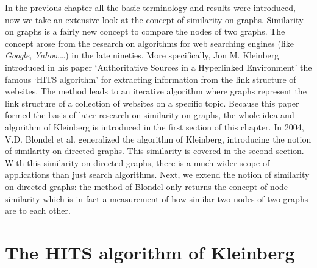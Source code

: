 \documentclass[a4paper,11pt]{report}
\begin{document}
In the previous chapter all the basic terminology and results were introduced, 
now we take an extensive look at the concept of similarity on graphs. Similarity on graphs is a fairly new
concept to compare the nodes of two graphs. The concept arose from the research on algorithms for web searching engines (like \emph{Google}, \emph{Yahoo},\ldots) in the late nineties. 
More specifically, Jon M. Kleinberg 
introduced in his paper `Authoritative Sources in a Hyperlinked Environment' 
\cite{kleinberg} the famous `HITS algorithm' for extracting information from the link structure of websites. The method leads to an iterative algorithm where 
graphs represent the link structure of a collection of websites on a specific topic. Because this paper formed the basis of later research on similarity on graphs, 
the
whole idea and algorithm of Kleinberg is introduced in the first section of this chapter. In 
2004, V.D. Blondel et al. \cite{blondel} generalized the algorithm of 
Kleinberg, introducing the notion of similarity on directed graphs. This similarity is covered in the second section. With this similarity on directed graphs, 
there is a much wider scope of applications than just search algorithms. Next, we extend the notion of similarity on directed graphs: the method
of Blondel only returns the concept of node similarity which is in fact a 
measurement of how similar two nodes of two graphs are to each other.

\section{The HITS algorithm of Kleinberg}
\end{document}
